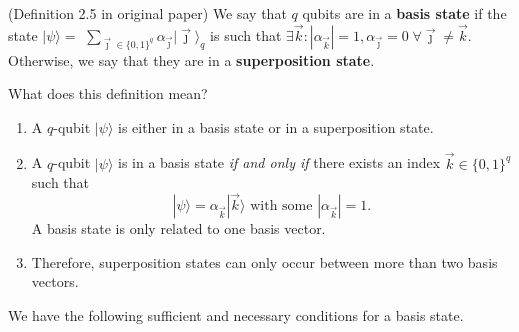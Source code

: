 \begin{definition} (Definition 2.5 in original paper) 
We say that $q$ qubits are in a \textbf{basis state} if the state $|\psi\rangle=$ $\sum_{\vec{\jmath} \in\{0,1\}^q} \alpha_{\vec{\jmath}}|\vec{\jmath}\rangle_q$ is such that $\exists \vec{k}:\left|\alpha_{\vec{k}}\right|=1, \alpha_{\vec{\jmath}}=0 \; \forall \vec{\jmath} \neq \vec{k}$. Otherwise, we say that they are in a \textbf{superposition state}.
\end{definition}
What does this definition mean?
\begin{enumerate}
    \item A $q$-qubit $|\psi\rangle$ is either in a basis state or in a superposition state.
    \item A $q$-qubit $|\psi\rangle$ is in a {basis state} \textit{if and only if} there exists an index $ \vec{k} \in
    \{0,1\}^q $ such that 
    \begin{equation*}
    |\psi\rangle=\alpha_{\vec{k}}|\vec{k}\rangle \text { with some }\left|\alpha_{\vec{k}}\right|=1.
    \end{equation*}
    A basis state is only related to one basis vector.
    \item Therefore, superposition states can only occur between more than two basis vectors.
\end{enumerate}

We have the following sufficient and necessary conditions for a basis state.


